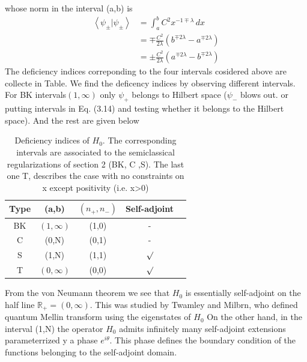 \documentclass[12pt]{report}
\newcommand*{\1}{\hspace{1pt}}
\begin{document}
        whose norm in the interval (a,b) is
        \begin{equation}
            \begin{split}
            \left\langle \psi_{\pm} | \psi_{\pm} \right\rangle &= \int_{a}^{b} C^{2} x^{-1\mp \lambda} \,dx \\
            &= \mp \frac{C^{2}}{2\lambda}\left(b^{\mp 2\lambda} - a^{\mp 2\lambda}\right) \\  
            &= \pm \frac{C^{2}}{2\lambda}\left(a^{\mp 2\lambda} - b^{\mp 2\lambda}\right) 
            \end{split}
        \end{equation}
        The deficiency indices correponding to the four intervals cosidered above are collecte in Table\cite{s8}. We find the deficency indices by observing different intervals.
        For BK intervals$(1,\infty)$ only $\psi_{+}$ belongs to Hilbert space ($\psi_{-}$ blows out. or putting intervals in Eq. (3.14) and testing whether it belongs to
        the Hilbert space)\cite{s7}. And the rest are given below
        
        \begin{longtable}[c]{c c c c c}
            \caption{Deficiency indices of $H_{0}$. The corresponding intervals are associated to the semiclassical regularizations of section 2 (BK, C ,S).
            The last one T, describes the case with no constraints on x except positivity (i.e. x>0)} \\
            \hline
             Type & (a,b) & $(n_{+}, n_{-})$ & Self-adjoint\\
             \hline 
             BK & $(1,\infty)$ & (1,0) & -\\  
             C & (0,N) & (0,1) &  -\\ 
             S & (1,N) & (1,1) & $\surd$ \\ 
             T & $(0,\infty)$ & (0,0) & $\surd $\\ 
            \hline
        \end{longtable}


        From the von Neumann theorem we see that $H_{0}$ is essentially self-adjoint on the half line $\mathbb{R} _{+} = (0, \infty)$. This was studied by Twamley and Milbrn, who
        defined quantum Mellin transform using the eigenstates of $H_{0}$\cite{s9}
        On the other hand, in the interval (1,N) the operator $H_{0}$ admits infinitely many self-adjoint extensions parameterrized y a phase $e^{i\theta}$. This phase defines the 
        boundary condition of the functions belonging to the self-adjoint domain.\cite{s7}
\end{document}
